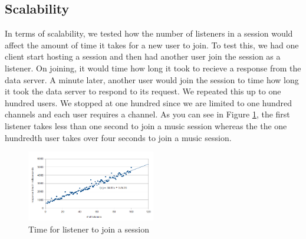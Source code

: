 \subsection{Scalability}
In terms of scalability, we tested how   
the number of listeners in a session 
would affect the amount of time it takes 
for a new user to join. 
To test this, we had one client start hosting a session and then had 
another user join the session as a listener. On joining, it would time 
how long it took to recieve a response from the data server. 
A minute later, another user would 
join the session to time how long it took the data server to respond to its request. 
We repeated this up to one hundred 
users. We stopped at one hundred  since we are limited to one hundred channels
and each user requires a channel. As you can see in Figure \ref{fig:addListenersJoinTime}, 
the first listener takes less than one second to join a music session 
whereas the the one hundredth user takes over four seconds to join a music session.  

\begin{figure}[h]
	\centering
	\includegraphics[width=0.5\textwidth]{add_listeners_response_time.png}
	\caption{Time for listener to join a session}
	\label{fig:addListenersJoinTime}
\end{figure}
